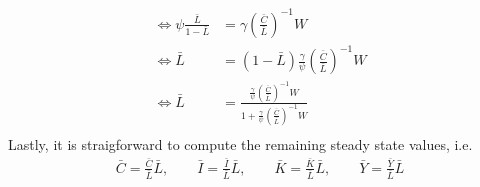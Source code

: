 \begin{Solution}{4}
\begin{align*}
			\Leftrightarrow \psi \frac{\bar{L}}{1-\bar{L}} &= \gamma \left(\frac{\bar{C}}{\bar{L}}\right)^{-1} W\\
			\Leftrightarrow \bar{L} &= (1-\bar{L})\frac{\gamma}{\psi} \left(\frac{\bar{C}}{\bar{L}}\right)^{-1} W\\
			\Leftrightarrow \bar{L} &= \frac{\frac{\gamma}{\psi} \left(\frac{\bar{C}}{\bar{L}}\right)^{-1} W}{1+\frac{\gamma}{\psi} \left(\frac{\bar{C}}{\bar{L}}\right)^{-1} W}\\
		\end{align*}
		Lastly, it is straigforward to compute the remaining steady state values, i.e.
		\begin{align*}
		\bar{C} = \frac{\bar{C}}{\bar{L}}\bar{L},\qquad
		\bar{I} = \frac{\bar{I}}{\bar{L}}\bar{L},\qquad
		\bar{K} = \frac{\bar{K}}{\bar{L}}\bar{L},	\qquad
		\bar{Y} = \frac{\bar{Y}}{\bar{L}}\bar{L}
		\end{align*}
		
\end{Solution}
